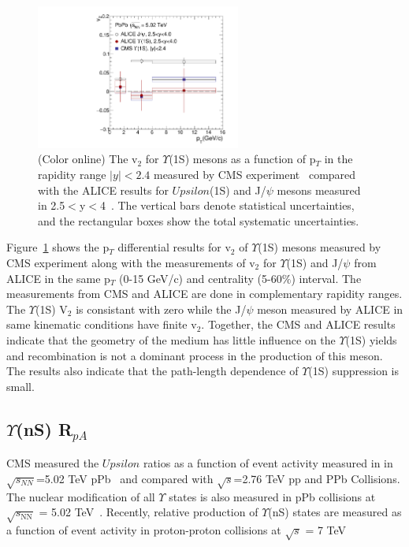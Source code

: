 \begin{figure}
  \begin{center}
\includegraphics[width=0.6\textwidth]{Figures/ExpOverview/Fig_CMS_ALICE_Y1S_5TeV_V2.pdf}
\caption{(Color online) The v$_{2}$ for $\Upsilon$(1S) mesons as a function of p$_{T}$ in the
  rapidity range $|y|<2.4$ measured by
  CMS experiment~\cite{CMS:2020efs} compared with the ALICE results for $Upsilon$(1S) and J/$\psi$ mesons measured
  in 2.5$<$y$<$4~\cite{ALICE:2019pox}. The vertical bars denote statistical uncertainties,
  and the rectangular boxes show the total systematic uncertainties.
}
\label{fig:Upsilon1SV2Compare}
\end{center}
\end{figure}

Figure~\ref{fig:Upsilon1SV2Compare} shows the p$_{T}$ differential results for v$_{2}$ of $\Upsilon$(1S)
mesons measured by CMS experiment along with the measurements of v$_{2}$ for $\Upsilon$(1S) and J/$\psi$
from ALICE in the same p$_{T}$ (0-15 GeV/c) and centrality (5-60$\%$) interval. The measurements from CMS
and ALICE are done in complementary rapidity ranges. The $\Upsilon$(1S) V$_{2}$ is consistant with zero while
the J/$\psi$ meson measured by ALICE in same kinematic conditions have finite v$_{2}$. Together, the CMS and ALICE
results indicate that the geometry of the medium has little influence on the $\Upsilon$(1S) yields and recombination is
not a dominant process in the production of this meson. The results also indicate that the path-length dependence of
$\Upsilon$(1S) suppression is small.



\subsection{$\Upsilon$(nS) R$_{pA}$ }

CMS measured the $Upsilon$ ratios as a function of event activity measured in 
in $\sqrt{s_{NN}}$=5.02 TeV pPb~\cite{CMS:2013jsu} and compared with $\sqrt{s}$=2.76 TeV pp
and PPb Collisions.
 The nuclear modification of all $\Upsilon$ states is also measured in pPb collisions
 at $\sqrt{s_\mathrm{NN}}$ = 5.02 TeV~\cite{CMS:2022wfi}.
 Recently, relative production of $\Upsilon$(nS) states are measured as a function of
 event activity in proton-proton collisions at $ \sqrt{s} $ = 7 TeV~\cite{CMS:2020fae}

